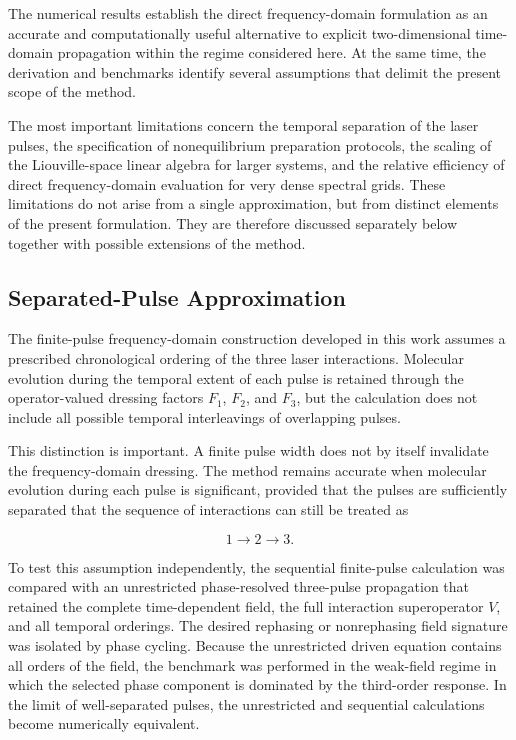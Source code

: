 \documentclass[11pt]{article}
\begin{document}
The numerical results establish the direct frequency-domain
formulation as an accurate and computationally useful alternative to
explicit two-dimensional time-domain propagation within the regime
considered here.  At the same time, the derivation and benchmarks
identify several assumptions that delimit the present scope of the
method.

The most important limitations concern the temporal separation of the
laser pulses, the specification of nonequilibrium preparation
protocols, the scaling of the Liouville-space linear algebra for larger
systems, and the relative efficiency of direct frequency-domain
evaluation for very dense spectral grids.  These limitations do not arise from a single
approximation, but from distinct elements of the present formulation.
They are therefore discussed separately below together with possible
extensions of the method.


\subsection{Separated-Pulse Approximation}
\label{subsec:separated_pulse_limitation}

The finite-pulse frequency-domain construction developed in this work
assumes a prescribed chronological ordering of the three laser
interactions.  Molecular evolution during the temporal extent of each
pulse is retained through the operator-valued dressing factors
$F_1$, $F_2$, and $F_3$, but the calculation does not include all
possible temporal interleavings of overlapping pulses.

This distinction is important.  A finite pulse width does not by
itself invalidate the frequency-domain dressing.  The method remains
accurate when molecular evolution during each pulse is significant,
provided that the pulses are sufficiently separated that the sequence
of interactions can still be treated as

\begin{equation}
1
\rightarrow
2
\rightarrow
3.
\end{equation}

To test this assumption independently, the sequential finite-pulse
calculation was compared with an unrestricted phase-resolved
three-pulse propagation that retained the complete time-dependent
field, the full interaction superoperator $V$, and all temporal
orderings. The desired rephasing or nonrephasing field signature was
isolated by phase cycling. Because the unrestricted driven equation
contains all orders of the field, the benchmark was performed in the
weak-field regime in which the selected phase component is dominated
by the third-order response. In the limit of well-separated pulses,
the unrestricted and sequential calculations become numerically
equivalent.
\end{document}
